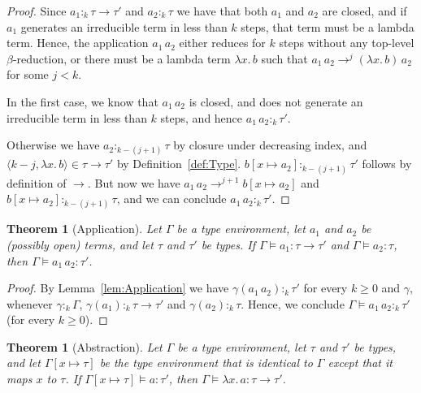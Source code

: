 \documentclass[10pt,a4paper,final,twocolumn]{article}
\theoremstyle{definition}
\theoremstyle{plain}
\newtheorem{theorem}[definition]{Theorem}
\newcommand{\abstr}[2]{\ensuremath{\lambda{#1}.\,{#2}}}
\newcommand{\app}[2]{\ensuremath{{#1}\,{#2}}}
\newcommand{\pair}[1]{\ensuremath{\langle{#1}\rangle}}
\begin{document}
\begin{proof}
  Since \mbox{$a_1 :_k \tau \to \tau'$} and \mbox{$a_2 :_k \tau$} we have that both $a_1$ and $a_2$ are closed,
  and if $a_1$ generates an irreducible term in less than $k$ steps, that term must be a lambda
  term. Hence, the application \mbox{$\app{a_1}{a_2}$} either reduces for $k$ steps without any top-level
  $\beta$-reduction, or there must be a lambda term \mbox{$\abstr{x}{b}$} such that
  \mbox{$\app{a_1}{a_2} \to^j \app{(\abstr{x}{b})}{a_2}$} for some \mbox{$j < k$}.

  In the first case, we know that \mbox{$\app{a_1}{a_2}$} is closed, and does not generate an irreducible
  term in less than $k$ steps, and hence \mbox{$\app{a_1}{a_2} :_k \tau'$}.

  Otherwise we have \mbox{$a_2 :_{k-(j+1)} \tau$} by closure under decreasing index, and
  \mbox{$\pair{k-j,\abstr{x}{b}} \in \tau \to \tau'$} by Definition~\ref{def:Type}.
  \mbox{$b[x \mapsto a_2] :_{k-(j+1)} \tau'$} follows by definition of $\to$. But now we have
  \mbox{$\app{a_1}{a_2} \to^{j+1} b[x \mapsto a_2]$} and \mbox{$b[x \mapsto a_2] :_{k-(j+1)} \tau$}, and
  we can conclude $\app{a_1}{a_2} :_k \tau'$.
\end{proof}

\begin{theorem}[Application] \label{thm:Application}
  Let $\Gamma$ be a type environment, let $a_1$ and $a_2$ be (possibly open) terms, and let
  $\tau$ and $\tau'$ be types. If \mbox{$\Gamma \models a_1 : \tau \to \tau'$} and
  \mbox{$\Gamma \models a_2 : \tau$}, then \mbox{$\Gamma \models \app{a_1}{a_2} : \tau'$}.
\end{theorem}

\begin{proof}
  By Lemma~\ref{lem:Application} we have \mbox{$\gamma(\app{a_1}{a_2}) :_k \tau'$} for every $k \ge 0$
  and $\gamma$, whenever \mbox{$\gamma :_k \Gamma$},
  \mbox{$\gamma(a_1) :_k \tau \to \tau'$} and \mbox{$\gamma(a_2) :_k \tau$}. Hence, we conclude
  \mbox{$\Gamma \models \app{a_1}{a_2} :_k \tau'$} (for every $k \ge 0$).
\end{proof}

\begin{theorem}[Abstraction] \label{thm:Abstraction}
  Let $\Gamma$ be a type environment, let $\tau$ and $\tau'$ be types, and let $\Gamma[x \mapsto \tau]$
  be the type environment that is identical to $\Gamma$ except that it maps $x$ to $\tau$. If
  \mbox{$\Gamma[x \mapsto \tau] \models a : \tau'$}, then
  \mbox{$\Gamma \models \abstr{x}{a} : \tau \to \tau'$}.
\end{theorem}
\end{document}
